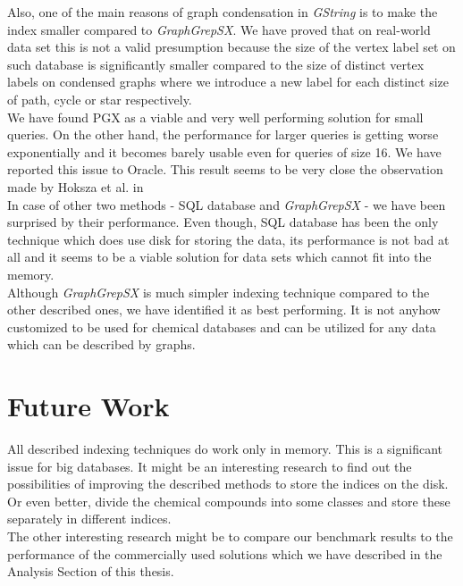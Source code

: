 Also, one of the main reasons of graph condensation in \textit{GString} is to make the index smaller compared to \textit{GraphGrepSX}. We have proved that on real-world data set this is not a valid presumption because the size of the vertex label set on such database is significantly smaller compared to the size of distinct vertex labels on condensed graphs where we introduce a new label for each distinct size of path, cycle or star respectively.\\

We have found PGX as a viable and very well performing solution for small queries. On the other hand, the performance for larger queries is getting worse exponentially and it becomes barely usable even for queries of size 16. We have reported this issue to Oracle. This result seems to be very close the observation made by Hoksza et al. in \cite{Hoksza}\\

In case of other two methods - SQL database and \textit{GraphGrepSX} - we have been surprised by their performance. Even though, SQL database has been the only technique which does use disk for storing the data, its performance is not bad at all and it seems to be a viable solution for data sets which cannot fit into the memory.\\

Although \textit{GraphGrepSX} is much simpler indexing technique compared to the other described ones, we have identified it as best performing. It is not anyhow customized to be used for chemical databases and can be utilized for any data which can be described by graphs.

\section*{Future Work}
All described indexing techniques do work only in memory. This is a significant issue for big databases. It might be an interesting research to find out the possibilities of improving the described methods to store the indices on the disk. Or even better, divide the chemical compounds into some classes and store these separately in different indices.\\

The other interesting research might be to compare our benchmark results to the performance of the commercially used solutions which we have described in the Analysis Section of this thesis. 

 
